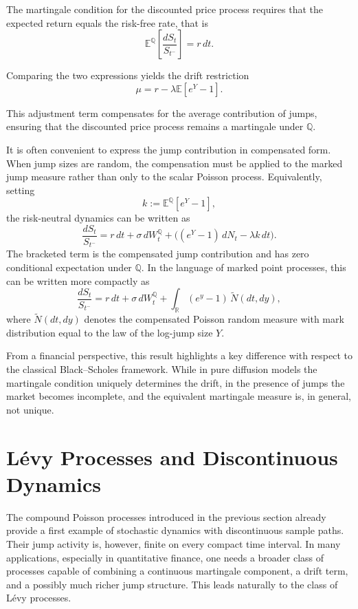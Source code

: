 The martingale condition for the discounted price process requires that the expected return equals the risk-free rate, that is
\[
\mathbb{E}^{\mathbb{Q}}\left[\frac{dS_t}{S_{t^-}}\right] = r \, dt.
\]

Comparing the two expressions yields the drift restriction
\[
\mu = r - \lambda \mathbb{E}[e^{Y} - 1].
\]

This adjustment term compensates for the average contribution of jumps, ensuring that the discounted price process remains a martingale under $\mathbb{Q}$.

It is often convenient to express the jump contribution in compensated form.
When jump sizes are random, the compensation must be applied to the marked jump
measure rather than only to the scalar Poisson process. Equivalently, setting
\[
    k:=\mathbb{E}^{\mathbb{Q}}[e^Y-1],
\]
the risk-neutral dynamics can be written as
\[
    \frac{dS_t}{S_{t^-}}
    =
    r\,dt+\sigma\,dW_t^{\mathbb{Q}}
    +
    \Big((e^Y-1)\,dN_t-\lambda k\,dt\Big).
\]
The bracketed term is the compensated jump contribution and has zero conditional
expectation under $\mathbb{Q}$. In the language of marked point processes, this
can be written more compactly as
\[
    \frac{dS_t}{S_{t^-}}
    =
    r\,dt+\sigma\,dW_t^{\mathbb{Q}}
    +
    \int_{\mathbb{R}}(e^y-1)\,\widetilde{N}(dt,dy),
\]
where $\widetilde{N}(dt,dy)$ denotes the compensated Poisson random measure with
mark distribution equal to the law of the log-jump size $Y$.


\medskip

From a financial perspective, this result highlights a key difference with respect to the classical Black--Scholes framework. While in pure diffusion models the martingale condition uniquely determines the drift, in the presence of jumps the market becomes incomplete, and the equivalent martingale measure is, in general, not unique.


\section{L\'evy Processes and Discontinuous Dynamics}
\label{sec:levy-processes}

The compound Poisson processes introduced in the previous section already provide a first example of stochastic dynamics with discontinuous sample paths. Their jump activity is, however, finite on every compact time interval. In many applications, especially in quantitative finance, one needs a broader class of processes capable of combining a continuous martingale component, a drift term, and a possibly much richer jump structure. This leads naturally to the class of L\'evy processes.

